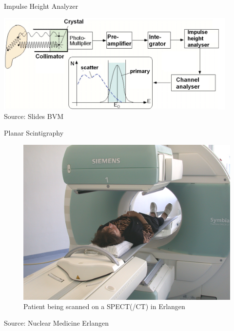 \begin{frame}{Impulse Height Analyzer}
    \begin{center}\includegraphics[width=0.9\textwidth]{images/impulse_height_analyzer}\\
        {\scriptsize Source: Slides BVM}
    \end{center}
\end{frame}


\begin{frame}{Planar Scintigraphy}
    \begin{figure}[]
        \centering
        \includegraphics[height=0.78\textheight]{images/spect_ct_patient}
        \caption{Patient being scanned on a SPECT(/CT) in Erlangen}%
    \end{figure}
    \flushright
    \vspace{-0.5cm}
    \tiny Source: Nuclear Medicine Erlangen
\end{frame}

